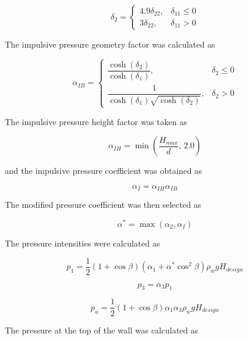 \documentclass[a4paper, 11pt]{article}
\begin{document}
\begin{equation}
    \delta_2=
    \begin{cases}
    4.9\delta_{22}, & \delta_{11}\leq0 \\
    3\delta_{22}, & \delta_{11}>0
    \end{cases}
\end{equation}

The impulsive pressure geometry factor was calculated as

\begin{equation}
    \alpha_{IB}=
    \begin{cases}
    \dfrac{\cosh(\delta_2)}{\cosh(\delta_1)}, & \delta_2\leq0 \\[6pt]
    \dfrac{1}{\cosh(\delta_1)\sqrt{\cosh(\delta_2)}}, & \delta_2>0
    \end{cases}
\end{equation}

The impulsive pressure height factor was taken as

\begin{equation}
    \alpha_{IH}=
    \min\left(\frac{H_{max}}{d},\,2.0\right)
\end{equation}

and the impulsive pressure coefficient was obtained as

\begin{equation}
    \alpha_I=\alpha_{IH}\alpha_{IB}
\end{equation}

The modified pressure coefficient was then selected as

\begin{equation}
    \alpha^*=\max(\alpha_2,\alpha_I)
\end{equation}

The pressure intensities were calculated as

\begin{equation}
    p_1=
    \frac{1}{2}(1+\cos\beta)
    \left(\alpha_1+\alpha^*\cos^2\beta\right)
    \rho_wgH_{design}
\end{equation}

\begin{equation}
    p_3=\alpha_3p_1
\end{equation}

\begin{equation}
    p_u=
    \frac{1}{2}(1+\cos\beta)\alpha_1\alpha_3\rho_wgH_{design}
\end{equation}

The pressure at the top of the wall was calculated as
\end{document}
